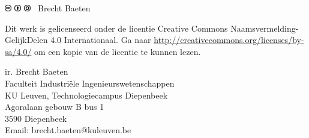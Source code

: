 \null
\vfill
\includegraphics[height=0.3cm]{../common/fig/cc}
\includegraphics[height=0.3cm]{../common/fig/by}
\includegraphics[height=0.3cm]{../common/fig/sa}
\quad \the\year\ Brecht Baeten
\vspace{0.5cm}

Dit werk is gelicenseerd onder de licentie Creative Commons Naamsvermelding-GelijkDelen 4.0 Internationaal. Ga naar \url{http://creativecommons.org/licenses/by-sa/4.0/} om een kopie van de licentie te kunnen lezen.
\vspace{4cm}

ir. Brecht Baeten\\
Faculteit Industriële Ingenieurswetenschappen\\
KU Leuven, Technologiecampus Diepenbeek\\
Agoralaan gebouw B bus 1\\
3590 Diepenbeek\\
Email: brecht.baeten@kuleuven.be\\